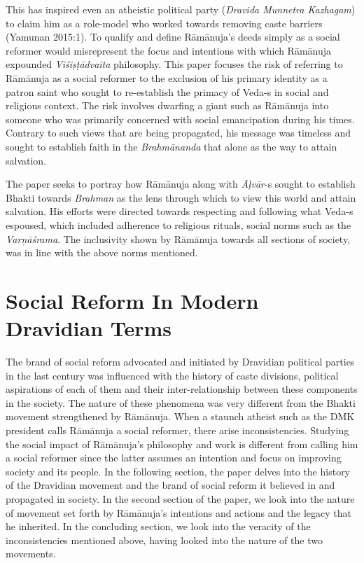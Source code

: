 This has inspired even an atheistic political party (\textit{Dravida Munnetra Kazhagam}) to claim him as a role-model who worked towards removing caste barriers (Yamunan 2015:1). To qualify and define Rāmānuja’s deeds simply as a social reformer would misrepresent the focus and intentions with which Rāmānuja expounded \textit{Viśiṣṭādvaita} philosophy. This paper focuses the risk of referring to Rāmānuja as a social reformer to the exclusion of his primary identity as a patron saint who sought to re-establish the primacy of Veda-s in social and religious context. The risk involves dwarfing a giant such as Rāmānuja into someone who was primarily concerned with social emancipation during his times. Contrary to such views that are being propagated, his message was timeless and sought to establish faith in the \textit{Brahmānanda} that alone as the way to attain salvation.

The paper seeks to portray how Rāmānuja along with \textit{Āḷvār}-s sought to establish Bhakti towards \textit{Brahman }as the lens through which to view this world and attain salvation. His efforts were directed towards respecting and following what Veda-s espoused, which included adherence to religious rituals, social norms such as the \textit{Varņāśrama}. The inclusivity shown by Rāmānuja towards all sections of society, was in line with the above norms mentioned.


\section*{Social Reform In Modern Dravidian Terms}

The brand of social reform advocated and initiated by Dravidian political parties in the last century was influenced with the history of caste divisions, political aspirations of each of them and their inter-relationship between these components in the society. The nature of these phenomena was very different from the Bhakti movement strengthened by Rāmānuja. When a staunch atheist such as the DMK president calls Rāmānuja a social reformer, there arise inconsistencies. Studying the social impact of Rāmānuja’s philosophy and work is different from calling him a social reformer since the latter assumes an intention and focus on improving society and its people. In the following section, the paper delves into the history of the Dravidian movement and the brand of social reform it believed in and propagated in society. In the second section of the paper, we look into the nature of movement set forth by Rāmānuja’s intentions and actions and the legacy that he inherited. In the concluding section, we look into the veracity of the inconsistencies mentioned above, having looked into the nature of the two movements.

